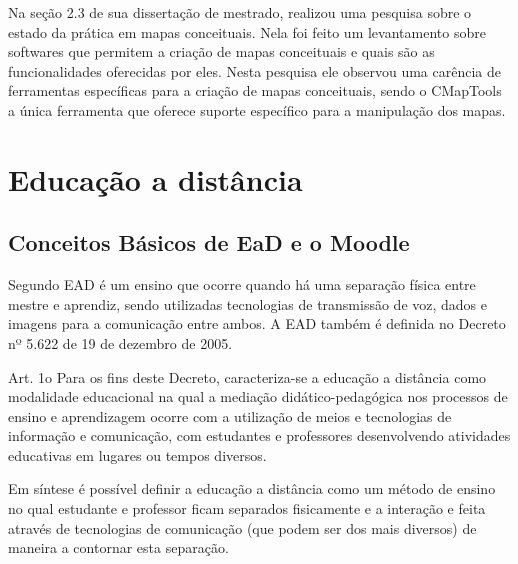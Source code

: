 \documentclass[
	12pt,				%
	openright,			%
	oneside,			%
	a4paper,			%
	english,			%
	french,				%
	spanish,			%
	brazil				%
	]{abntex2}
\begin{document}
Na seção 2.3 de sua dissertação de mestrado,  realizou uma pesquisa sobre o estado da prática em mapas conceituais. Nela foi feito um levantamento sobre softwares que permitem a criação de mapas conceituais e quais são as funcionalidades oferecidas por eles. Nesta pesquisa ele observou uma carência de ferramentas específicas para a criação de mapas conceituais, sendo o CMapTools a única ferramenta que oferece suporte específico para a manipulação dos mapas.
  




\chapter{Educação a distância}
\section{Conceitos Básicos de EaD e o Moodle}

Segundo  EAD é um ensino que ocorre quando há uma separação física entre mestre e aprendiz, sendo utilizadas tecnologias de transmissão de voz, dados e imagens para a comunicação entre ambos. A EAD também é definida no Decreto nº 5.622 de 19 de dezembro de 2005\cite{BRASIL2005}.
 \begin{citacao}
 	Art. 1o  Para os fins deste Decreto, caracteriza-se a educação a distância como modalidade educacional na qual a mediação didático-pedagógica nos processos de ensino e aprendizagem ocorre com a utilização de meios e tecnologias de informação e comunicação, com estudantes e professores desenvolvendo atividades educativas em lugares ou tempos diversos\cite{BRASIL2005}.
 \end{citacao}
 
Em síntese é possível definir a educação a distância como um método de ensino no qual estudante e professor ficam separados fisicamente e a interação e feita através de tecnologias de comunicação (que podem ser dos mais diversos) de maneira a contornar esta separação.
\end{document}
